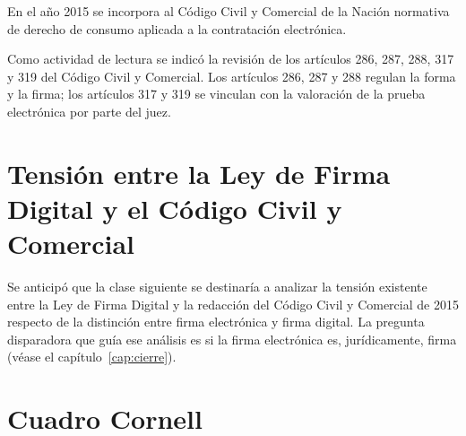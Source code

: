 \documentclass[12pt,oneside]{book}
\begin{document}
En el año 2015 se incorpora al Código Civil y Comercial de la Nación normativa de derecho de consumo aplicada a la contratación electrónica.

Como actividad de lectura se indicó la revisión de los artículos 286, 287, 288, 317 y 319 del Código Civil y Comercial. Los artículos 286, 287 y 288 regulan la forma y la firma; los artículos 317 y 319 se vinculan con la valoración de la prueba electrónica por parte del juez.

\section{Tensión entre la Ley de Firma Digital y el Código Civil y Comercial}

Se anticipó que la clase siguiente se destinaría a analizar la tensión existente entre la Ley de Firma Digital y la redacción del Código Civil y Comercial de 2015 respecto de la distinción entre firma electrónica y firma digital. La pregunta disparadora que guía ese análisis es si la firma electrónica es, jurídicamente, firma (véase el capítulo~\ref{cap:cierre}).

\section{Cuadro Cornell}
\end{document}
